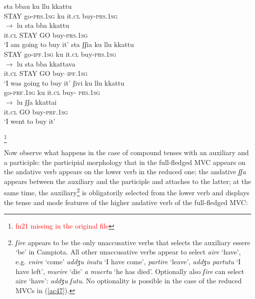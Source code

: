 \documentclass[output=paper]{langscibook}
\begin{document}
\ea\label{ac46}
    \ea\label{ac46a}
        \ea \label{ac46ai}\gll sta    bbau     ku   llu   kkattu\\
        STAY go-\textsc{prs}.\textsc{1sg}  ku   it.\textsc{cl} buy-\textsc{prs}.\textsc{1sg}   \\
        \ex \label{ac46aii}$\rightarrow$ \gll lu    sta    bba  kkattu\\
        it.\textsc{cl}  STAY GO  buy-\textsc{prs}.\textsc{1sg} \\
        \glt ‘I am going to buy it’
        \z
    \ex\label{ac46b}
        \ea  \label{ac46bi}\gll sta    ʃʃia       ku   llu    kkattu \\
       STAY go-\textsc{ipf}.\textsc{1sg}  ku   it.\textsc{cl}  buy-\textsc{prs}.\textsc{1sg}  \\
        \ex  \label{ac46bii}$\rightarrow$ \gll lu    sta    bba   kkattava\\
       it.\textsc{cl}   STAY GO   buy--\textsc{ipf}.\textsc{1sg}\\
       \glt ‘I was going to buy it’
        \z
    \ex\label{ac46c}
        \ea  \label{ac46ci}\gll ʃivi       ku   llu   kkattu \\
       go-\textsc{prf}.\textsc{1sg}  ku   it.\textsc{cl}  buy- \textsc{prs}.\textsc{1sg} \\
        \ex  \label{ac46cii}$\rightarrow$ \gll lu     ʃʃa   kkattai\\
       it.\textsc{cl}   GO  buy-\textsc{prf}.\textsc{1sg}\\
       \glt ‘I went to buy it’
        \z
    \z
\z

\footnote{\textcolor{red}{fn21 missing in the original file}}

Now observe what happens in the case of compound tenses with an auxiliary and a participle: the participial morphology that in the full-fledged MVC appears on the andative verb appears on the lower verb in the reduced one; the andative \textit{ʃʃa}  appears between the auxiliary and the participle and attaches to the latter; at the same time, the auxiliary\footnote{\textit{ʃire} appears to be the only unaccusative verbs that selects the auxiliary essere ‘be’ in Campiota.  All other unaccusative verbs appear to select \textit{aire} ‘have’, e.g. \textit{enire} ‘come’ \textit{addʒu inutu} ‘I have come’, \textit{partire} ‘leave’, \textit{addʒu partutu} ‘I have left’, \textit{murire} ‘die’ \textit{a muertu} ‘he has died’. Optionally also \textit{ʃire} can select aire ‘have’: \textit{addʒu ʃutu}.  No optionality is possible in the case of the reduced MVCs in (\ref{ac47}).}  is obligatorily selected from the lower verb and displays the tense and mode features of the higher andative verb of the full-fledged MVC:
\end{document}
